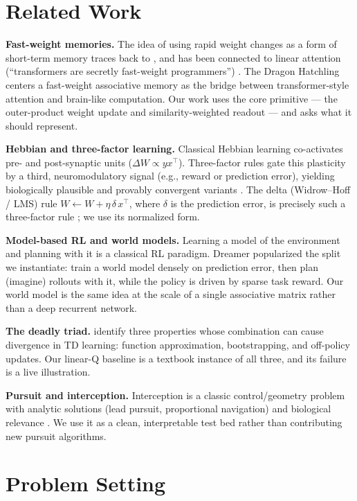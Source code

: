 \documentclass[11pt]{article}
\begin{document}
\section{Related Work}\label{sec:related}

\textbf{Fast-weight memories.} The idea of using rapid weight changes as a form of short-term
memory traces back to \cite{schmidhuber1992}, and has been connected to linear attention
(``transformers are secretly fast-weight programmers'') \cite{schlag2021}. The Dragon Hatchling
\cite{bdh2025} centers a fast-weight associative memory as the bridge between
transformer-style attention and brain-like computation. Our work uses the core primitive ---
the outer-product weight update and similarity-weighted readout --- and asks what it should
represent.

\textbf{Hebbian and three-factor learning.} Classical Hebbian learning co-activates pre- and
post-synaptic units ($\Delta W \propto y x^\top$). Three-factor rules gate this plasticity by a
third, neuromodulatory signal (e.g., reward or prediction error), yielding biologically
plausible and provably convergent variants \cite{fremaux2015}. The delta (Widrow--Hoff / LMS)
rule $W \leftarrow W + \eta\,\delta\,x^\top$, where $\delta$ is the prediction error, is
precisely such a three-factor rule \cite{widrow1960}; we use its normalized form.

\textbf{Model-based RL and world models.} Learning a model of the environment and planning with
it is a classical RL paradigm. Dreamer \cite{hafner2023} popularized the split we instantiate:
train a world model densely on prediction error, then plan (imagine) rollouts with it, while
the policy is driven by sparse task reward. Our world model is the same idea at the scale of a
single associative matrix rather than a deep recurrent network.

\textbf{The deadly triad.} \cite{sutton2018} identify three properties whose combination can
cause divergence in TD learning: function approximation, bootstrapping, and off-policy updates.
Our linear-Q baseline is a textbook instance of all three, and its failure is a live
illustration.

\textbf{Pursuit and interception.} Interception is a classic control/geometry problem with
analytic solutions (lead pursuit, proportional navigation) \cite{shneydor1998,nahin2007} and
biological relevance \cite{fajen2003}. We use it as a clean, interpretable test bed rather than
contributing new pursuit algorithms.

\section{Problem Setting}\label{sec:problem}
\end{document}
